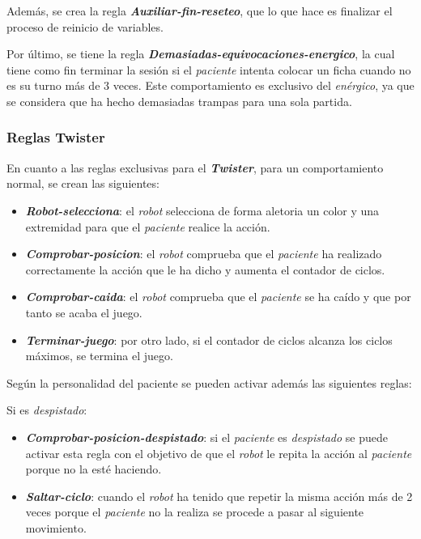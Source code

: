 \documentclass{uc3mpracticas}
\begin{document}
  \vspace{2mm}

  Además, se crea la regla \textbf{\textit{Auxiliar-fin-reseteo}}, que lo que hace es finalizar el proceso de reinicio de variables.

  \vspace{2mm}

  Por último, se tiene la regla \textbf{\textit{Demasiadas-equivocaciones-energico}}, la cual tiene como fin terminar la sesión si el \textit{paciente} intenta colocar un ficha cuando no es su turno más de 3 veces. Este comportamiento es exclusivo del \textit{enérgico}, ya que se considera que ha hecho demasiadas trampas para una sola partida.




  \subsubsection{Reglas Twister}

  En cuanto a las reglas exclusivas para el \textit{\textbf{Twister}}, para un comportamiento normal, se crean las siguientes:

  \begin{itemize}
    \item \textbf{\textit{Robot-selecciona}}: el \textit{robot} selecciona de forma aletoria un color y una extremidad para que el \textit{paciente} realice la acción.
    \item \textbf{\textit{Comprobar-posicion}}: el \textit{robot} comprueba que el \textit{paciente} ha realizado correctamente la acción que le ha dicho y aumenta el contador de ciclos.
    \item \textbf{\textit{Comprobar-caida}}: el \textit{robot} comprueba que el \textit{paciente} se ha caído y que por tanto se acaba el juego.
    \item \textbf{\textit{Terminar-juego}}: por otro lado, si el contador de ciclos alcanza los ciclos máximos, se termina el juego.
  \end{itemize}

  Según la personalidad del paciente se pueden activar además las siguientes reglas:

  \vspace{2mm}

  Si es \textit{despistado}:

  \begin{itemize}
    \item \textbf{\textit{Comprobar-posicion-despistado}}: si el \textit{paciente} es \textit{despistado} se puede activar esta regla con el objetivo de que el \textit{robot} le repita la acción al \textit{paciente} porque no la esté haciendo.
    \item \textbf{\textit{Saltar-ciclo}}: cuando el \textit{robot} ha tenido que repetir la misma acción más de 2 veces porque el \textit{paciente} no la realiza se procede a pasar al siguiente movimiento.
  \end{itemize}
\end{document}
